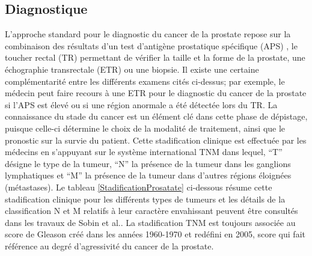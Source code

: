 \subsection{Diagnostique}
L’approche standard pour le diagnostic du cancer de la prostate repose sur la combinaison des résultats d’un test d’antigène prostatique spécifique (APS) , le toucher rectal (TR)  permettant de vérifier la taille et la forme de la prostate, une échographie transrectale (ETR)  ou une biopsie. Il existe une certaine complémentarité entre les différents examens cités ci-dessus; par exemple, le médecin peut faire recours à une ETR pour le diagnostic du cancer de la prostate si l’APS est élevé ou si une région anormale a été détectée lors du TR.   La connaissance du stade du cancer est un élément clé dans cette phase de dépistage, puisque celle-ci détermine le choix de la modalité de traitement, ainsi que le pronostic sur la survie du patient. Cette stadification clinique est effectuée par les médecins en s’appuyant sur le système international TNM \cite{Sobin} dans lequel, \enquote{T} désigne le type de la tumeur, \enquote{N} la présence de la tumeur dans les ganglions lymphatiques et \enquote{M} la présence de la tumeur dans d’autres régions éloignées (métastases). Le tableau \ref{StadificationProsatate} ci-dessous résume cette stadification clinique pour les différents types de tumeurs et les détails de la classification N et M relatifs à leur caractère envahissant peuvent être consultés dans les travaux de Sobin et al.\cite{Sobin}. La stadification TNM est toujours associée au score de Gleason \cite{Chen, Salomon} créé dans les années 1960-1970 et redéfini en 2005, score qui fait référence au degré d’agressivité du cancer de la prostate.
%
